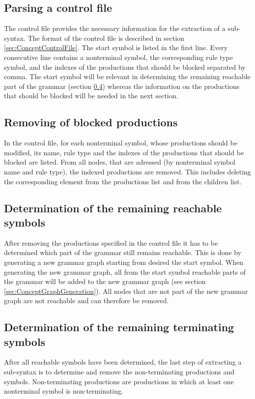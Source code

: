 \subsection{Parsing a control file}\label{sec:ConceptParsingControlFile}
The control file provides the necessary information for the extraction of a sub-syntax.
The format of the control file is described in section \ref{sec:ConceptControlFile}. 
The start symbol is listed in the first line.
Every consecutive line contains a nonterminal symbol, the corresponding rule type symbol, and the indexes of the productions that should be blocked separated by comma.
The start symbol will be relevant in determining the remaining reachable part of the grammar (section \ref{sec:ConceptDerterminingRemainingReachable}) whereas the information on the productions that should be blocked will be needed in the next section.

\subsection{Removing of blocked productions}\label{sec:ConceptRemovingBlockedProductions}
In the control file, for each nonterminal symbol, whose productions should be modified, its name, rule type and the indexes of the productions that should be blocked are listed.
From all nodes, that are adressed (by nonterminal symbol name and rule type), the indexed productions are removed.
This includes deleting the corresponding element from the productions list and from the children list.

\subsection{Determination of the remaining reachable symbols}\label{sec:ConceptDerterminingRemainingReachable}
After removing the productions specified in the control file it has to be determined which part of the grammar still remains reachable.
This is done by generating a new grammar graph starting from desired the start symbol.
When generating the new grammar graph, all from the start symbol reachable parts of the grammar will be added to the new grammar graph (see section \ref{sec:ConceptGraphGeneration}).
All nodes that are not part of the new grammar graph are not reachable and can therefore be removed.

\subsection{Determination of the remaining terminating symbols}\label{sec:ConceptDerterminingRemainingReachable}
After all reachable symbols have been determined, the last step of extracting a sub-syntax is to determine and remove the non-terminating productions and symbols.
Non-terminating productions are productions in which at least one nonterminal symbol is non-terminating.\\

